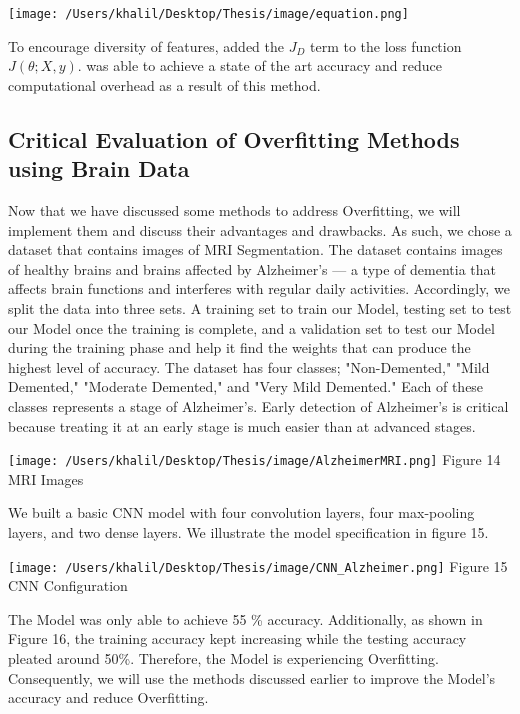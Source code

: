\documentclass[oneside,12pt,article]{article}
\begin{document}
\begin{center}
\texttt{[image: /Users/khalil/Desktop/Thesis/image/equation.png]} 
\end{center}
To encourage diversity of features, \cite{ayinde2019regularizing} added the $J_D$ term to the loss function $J (\theta; X, y)$. \cite{ayinde2019regularizing} was able to achieve a state of the art accuracy and reduce computational overhead as a result of this method.





\subsection{Critical Evaluation of Overfitting Methods using Brain Data}
Now that we have discussed some methods to address Overfitting, we will implement them and discuss their advantages and drawbacks. As such, we chose a dataset that contains images of MRI Segmentation. The dataset contains images of healthy brains and brains affected by Alzheimer's — a type of dementia that affects brain functions and interferes with regular daily activities. Accordingly, we split the data into three sets. A training set to train our Model, testing set to test our Model once the training is complete, and a validation set to test our Model during the training phase and help it find the weights that can produce the highest level of accuracy. The dataset has four classes; "Non-Demented," "Mild Demented," "Moderate Demented," and "Very Mild Demented." Each of these classes represents a stage of Alzheimer's. Early detection of Alzheimer's is critical because treating it at an early stage is much easier than at advanced stages.  
 \begin{center}
\texttt{[image: /Users/khalil/Desktop/Thesis/image/AlzheimerMRI.png]} 
\newline
Figure 14 MRI Images
\end{center}
We built a basic CNN model with four convolution layers, four max-pooling layers, and two dense layers. We illustrate the model specification in figure 15.  
 \begin{center}
\texttt{[image: /Users/khalil/Desktop/Thesis/image/CNN\_Alzheimer.png]} 
\newline
Figure 15 CNN Configuration
\end{center}
The Model was only able to achieve 55 \% accuracy. Additionally, as shown in Figure 16, the training accuracy kept increasing while the testing accuracy pleated around 50\%. Therefore, the Model is experiencing Overfitting. Consequently, we will use the methods discussed earlier to improve the Model's accuracy and reduce Overfitting.  
\end{document}
